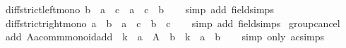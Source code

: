 \begin{isabellebody}
\endisatagproof
{\isafoldproof}%
%
\isadelimproof
\isanewline
%
\endisadelimproof
\isanewline
{}\isamarkupfalse%
\ diff{\isacharunderscore}{\kern0pt}strict{\isacharunderscore}{\kern0pt}left{\isacharunderscore}{\kern0pt}mono{\isacharcolon}{\kern0pt}\ {\isachardoublequoteopen}b\ {\isacharless}{\kern0pt}\ a\ {\isasymLongrightarrow}\ c\ {\isacharminus}{\kern0pt}\ a\ {\isacharless}{\kern0pt}\ c\ {\isacharminus}{\kern0pt}\ b{\isachardoublequoteclose}\isanewline
%
\isadelimproof
\ \ %
\endisadelimproof
%
\isatagproof
{}\isamarkupfalse%
\ {\isacharparenleft}{\kern0pt}simp\ add{\isacharcolon}{\kern0pt}\ field{\isacharunderscore}{\kern0pt}simps{\isacharparenright}{\kern0pt}%
\endisatagproof
{\isafoldproof}%
%
\isadelimproof
\isanewline
%
\endisadelimproof
\isanewline
{}\isamarkupfalse%
\ diff{\isacharunderscore}{\kern0pt}strict{\isacharunderscore}{\kern0pt}right{\isacharunderscore}{\kern0pt}mono{\isacharcolon}{\kern0pt}\ {\isachardoublequoteopen}a\ {\isacharless}{\kern0pt}\ b\ {\isasymLongrightarrow}\ a\ {\isacharminus}{\kern0pt}\ c\ {\isacharless}{\kern0pt}\ b\ {\isacharminus}{\kern0pt}\ c{\isachardoublequoteclose}\isanewline
%
\isadelimproof
\ \ %
\endisadelimproof
%
\isatagproof
{}\isamarkupfalse%
\ {\isacharparenleft}{\kern0pt}simp\ add{\isacharcolon}{\kern0pt}\ field{\isacharunderscore}{\kern0pt}simps{\isacharparenright}{\kern0pt}%
\endisatagproof
{\isafoldproof}%
%
\isadelimproof
\isanewline
%
\endisadelimproof
\isanewline
{}\isamarkupfalse%
\isanewline
\isanewline
{}\isamarkupfalse%
\ group{\isacharunderscore}{\kern0pt}cancel\isanewline
{}\isanewline
\isanewline
{}\isamarkupfalse%
\ add{}{\isacharcolon}{\kern0pt}\ {\isachardoublequoteopen}{\isacharparenleft}{\kern0pt}A{\isacharcolon}{\kern0pt}{\isacharcolon}{\kern0pt}{\isacharprime}{\kern0pt}a{\isacharcolon}{\kern0pt}{\isacharcolon}{\kern0pt}comm{\isacharunderscore}{\kern0pt}monoid{\isacharunderscore}{\kern0pt}add{\isacharparenright}{\kern0pt}\ {\isasymequiv}\ k\ {\isacharplus}{\kern0pt}\ a\ {\isasymLongrightarrow}\ A\ {\isacharplus}{\kern0pt}\ b\ {\isasymequiv}\ k\ {\isacharplus}{\kern0pt}\ {\isacharparenleft}{\kern0pt}a\ {\isacharplus}{\kern0pt}\ b{\isacharparenright}{\kern0pt}{\isachardoublequoteclose}\isanewline
%
\isadelimproof
\ \ %
\endisadelimproof
%
\isatagproof
{}\isamarkupfalse%
\ {\isacharparenleft}{\kern0pt}simp\ only{\isacharcolon}{\kern0pt}\ ac{\isacharunderscore}{\kern0pt}simps{\isacharparenright}{\kern0pt}%
\endisatagproof
{\isafoldproof}%
%
\isadelimproof

\end{isabellebody}
